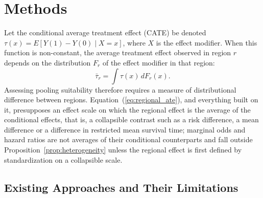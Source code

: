 \documentclass[AMA,Times1COL]{WileyNJDv5}
\begin{document}
\section{Methods}\label{sec:methods}

Let the conditional average treatment effect (CATE) be denoted $\tau(x) = E[Y(1) - Y(0) \mid X = x]$, where $X$ is the effect modifier. When this function is non-constant, the average treatment effect observed in region $r$ depends on the distribution $F_r$ of the effect modifier in that region:
\begin{equation}
\bar{\tau}_r = \int \tau(x) \, dF_r(x).
\label{eq:regional_ate}
\end{equation}
Assessing pooling suitability therefore requires a measure of distributional difference between regions. Equation~(\ref{eq:regional_ate}), and everything built on it, presupposes an effect scale on which the regional effect is the average of the conditional effects, that is, a collapsible contrast such as a risk difference, a mean difference or a difference in restricted mean survival time; marginal odds and hazard ratios are not averages of their conditional counterparts and fall outside Proposition~\ref{prop:heterogeneity} unless the regional effect is first defined by standardization on a collapsible scale.

\subsection{Existing Approaches and Their Limitations}\label{sec:existing}
\end{document}
